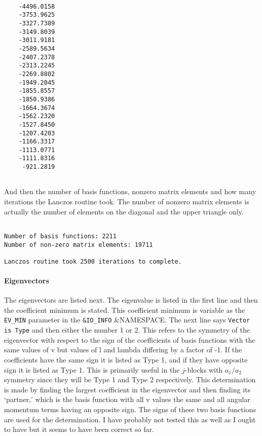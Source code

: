 \documentclass{article}
\begin{document}
\begin{verbatim}

	-4496.0158
	-3753.9625
	-3327.7389
	-3149.8039
	-3011.9181
	-2589.5634
	-2407.2378
	-2313.2245
	-2269.8802
	-1949.2045
	-1855.8557
	-1850.9386
	-1664.3674
	-1562.2320
	-1527.8450
	-1207.4203
	-1166.3317
	-1113.0771
	-1111.8316
	 -921.2819
	 
\end{verbatim}

And then the number of basis functions, nonzero matrix elements and how many iterations the Lanczos routine took. The number of nonzero matrix elements is actually the number of elements on the diagonal and the upper triangle only. 

\begin{verbatim}
 
Number of basis functions: 2211
Number of non-zero matrix elements: 19711
 
Lanczos routine took 2500 iterations to complete.

\end{verbatim}

\paragraph{Eigenvectors}
The eigenvectors are listed next. The eigenvalue is listed in the first line and then the coefficient minimum is stated. This coefficient minimum is variable as the {\tt EV\_MIN} parameter in the {\tt \&IO\_INFO} \&NAMESPACE. The next line says {\tt Vector is Type} and then either the number 1 or 2. This refers to the symmetry of the eigenvector with respect to the sign of the coefficients of basis functions with the same values of v but values of l and lambda differing by a factor of -1. If the coefficients have the same sign it is listed as Type 1, and if they have opposite sign it is listed as Type 1. This is primarily useful in the $j$-blocks with $a_1/a_2$ symmetry since they will be Type 1 and Type 2 respectively. This determination is made by finding the largest coefficient in the eigenvector and then finding its `partner,' which is the basis function with all v values the same and all angular momentum terms having an opposite sign. The signs of these two basis functions are used for the determination. I have probably not tested this as well as I ought to have but it seems to have been correct so far.
\end{document}
